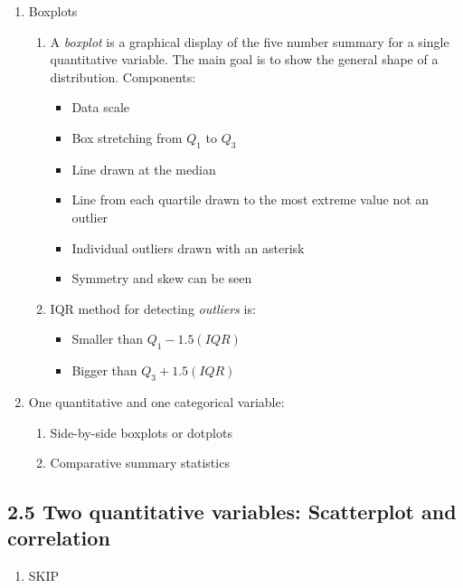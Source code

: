 \documentclass{article}
\begin{document}
\begin{enumerate}

\item Boxplots
\begin{enumerate}
\item A \emph{boxplot} is a graphical display of the five number summary for a single quantitative variable. The main goal is to show the general shape of a distribution. Components:
\begin{itemize}
\item Data scale
\item Box stretching from $Q_1$ to $Q_3$
\item Line drawn at the median
\item Line from each quartile drawn to the most extreme value not an outlier
\item Individual outliers drawn with an asterisk
\item Symmetry and skew can be seen
\end{itemize}
\item IQR method for detecting \emph{outliers} is:
\begin{itemize}
\item Smaller than $Q_1 - 1.5(IQR)$
\item Bigger than $Q_3 + 1.5(IQR)$
\end{itemize}
\end{enumerate}

\item One quantitative and one categorical variable:
\begin{enumerate}
\item Side-by-side boxplots or dotplots
\item Comparative summary statistics 
\end{enumerate}

\end{enumerate}

\subsection{2.5 Two quantitative variables: Scatterplot and correlation}
\begin{enumerate}

\item SKIP

\end{enumerate}

\end{document}
